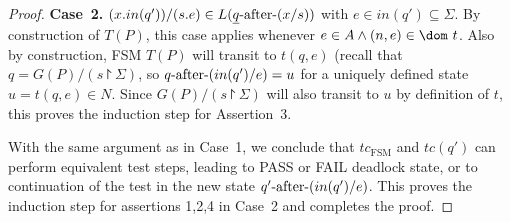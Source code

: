 \begin{proof}
 
\medskip
\noindent
{\bf Case~2.} $(x.in(q'))/(s.e) \in L(\underline{q}\text{-after-} (x/s))$ with $e\in in(q')\subseteq\Sigma$.\newline
By construction of $T(P)$, this case applies whenever $e\in A\wedge (n,e)\in\dom~t$.
Also by construction, FSM $T(P)$ will transit to $t(q,e)$ (recall that
$q = G(P)/(s\project \Sigma)$, so
$q\text{-after-}(in(q')/e) = u$ for a uniquely defined state $u= t(q,e) \in N$. Since 
$G(P)/(s\project \Sigma)$ will also transit to $u$ by definition of $t$, this proves the induction step for Assertion~3.

With the same argument as in Case~1, we conclude that $tc_\text{FSM}$ and
$tc(q')$ can perform equivalent test steps, leading to PASS or FAIL deadlock state,
or to continuation of the test in the new state $q'\text{-after-}(in(q')/e)$.
This proves the induction step for assertions 1,2,4 in Case~2 and completes the proof.
\xbox
\end{proof}























